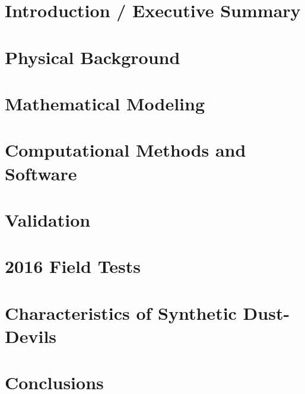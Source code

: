 \documentclass[final,letterpaper,12pt]{report}    %
\theoremstyle{definition}
\theoremstyle{remark}
\begin{document}
%
%
\chapter{Introduction / Executive Summary}


\chapter{Physical Background}


\chapter{Mathematical Modeling}


\chapter{Computational Methods and Software}


\chapter{Validation}


\chapter{2016 Field Tests}


\chapter{Characteristics of Synthetic Dust-Devils}


\chapter{Conclusions}

\end{document}
